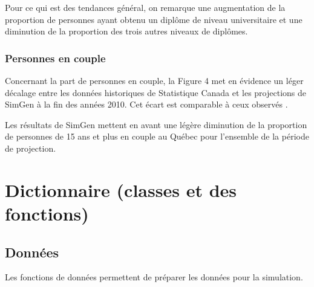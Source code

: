 \documentclass[letterpaper,10pt,french]{sphinxmanual}
\begin{document}
Pour ce qui est des tendances général, on remarque une augmentation de la proportion de personnes ayant obtenu un diplôme de niveau universitaire et une diminution de la proportion des trois autres niveaux de diplômes.


\subsection{Personnes en couple}
\label{\detokenize{resultats:personnes-en-couple}}
\begin{figure}[htbp]
\centering

\noindent{}
\end{figure}

Concernant la part de personnes en couple, la Figure 4 met en évidence un léger décalage entre les données historiques de Statistique Canada et les projections de SimGen à la fin des années 2010. Cet écart est comparable à ceux observés .

Les résultats de SimGen mettent en avant une légère diminution de la proportion de personnes de 15 ans et plus en couple au Québec pour l’ensemble de la période de projection.


\chapter{Dictionnaire (classes et des fonctions)}
\label{\detokenize{code:module-simgen}}\label{\detokenize{code:dictionnaire-classes-et-des-fonctions}}\label{\detokenize{code:code}}\label{\detokenize{code::doc}}

\section{Données}
\label{\detokenize{code:donnees}}
Les fonctions de données permettent de préparer les données pour la simulation.
\end{document}
